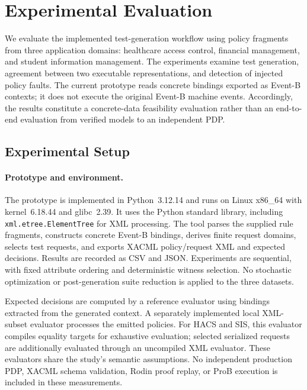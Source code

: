 \section{Experimental Evaluation}
\label{sec:experimental_evaluation}

We evaluate the implemented test-generation workflow using policy
fragments from three application domains: healthcare access control,
financial management, and student information management. The
experiments examine test generation, agreement between two executable
representations, and detection of injected policy faults. The current
prototype reads concrete bindings exported as Event-B contexts; it does
not execute the original Event-B machine events. Accordingly, the
results constitute a concrete-data feasibility evaluation rather than
an end-to-end evaluation from verified models to an independent PDP.

\subsection{Experimental Setup}
\label{subsec:exp_setup}

\paragraph{Prototype and environment.}
The prototype is implemented in Python~3.12.14 and runs on Linux
x86\_64 with kernel~6.18.44 and glibc~2.39. It uses the Python standard
library, including \texttt{xml.etree.ElementTree} for XML processing.
The tool parses the supplied rule fragments, constructs concrete
Event-B bindings, derives finite request domains, selects test requests,
and exports XACML policy/request XML and expected decisions. Results
are recorded as CSV and JSON. Experiments are sequential, with fixed
attribute ordering and deterministic witness selection. No stochastic
optimization or post-generation suite reduction is applied to the
three datasets.

Expected decisions are computed by a reference evaluator using bindings
extracted from the generated context. A separately implemented local
XML-subset evaluator processes the emitted policies. For HACS and SIS,
this evaluator compiles equality targets for exhaustive evaluation;
selected serialized requests are additionally evaluated through an
uncompiled XML evaluator. These evaluators share the study's semantic
assumptions. No independent production PDP, XACML schema validation,
Rodin proof replay, or ProB execution is included in these measurements.

